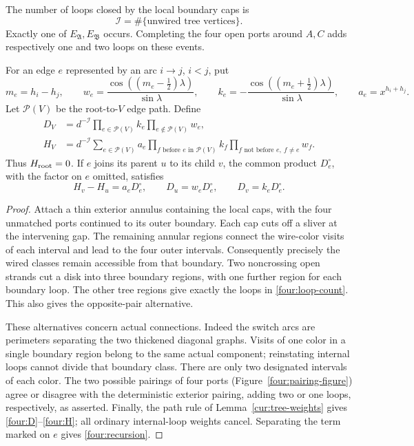 \begin{lemma}
\label{four:tree}
The number of loops closed by the local boundary caps is
\begin{equation}
 \mathcal I=\#\{\text{unwired tree vertices}\}.
 \label{four:loop-count}
\end{equation}
Exactly one of $E_{\mathfrak A},E_{\mathfrak B}$ occurs.  Completing the
four open ports around $A,C$ adds respectively one and two loops on these
events.

For an edge $e$ represented by an arc $i\to j$, $i<j$, put
\begin{equation}
 m_e=h_i-h_j,\qquad
 w_e=\frac{\cos((m_e-\tfrac12)\lambda)}{\sin\lambda},\qquad
 k_e=-\frac{\cos((m_e+\tfrac12)\lambda)}{\sin\lambda},\qquad
 a_e=x^{h_i+h_j}.
 \label{four:edge-weights}
\end{equation}
Let $\mathcal P(V)$ be the root-to-$V$ edge path.  Define
\begin{align}
 D_V&=d^{-\mathcal I}\prod_{e\in\mathcal P(V)}k_e
                         \prod_{e\notin\mathcal P(V)}w_e,\label{four:D}\\
 H_V&=d^{-\mathcal I}\sum_{e\in\mathcal P(V)}a_e
       \prod_{f\text{ before }e\text{ in }\mathcal P(V)}k_f
       \prod_{f\text{ not before }e,\ f\ne e}w_f.
       \label{four:H}
\end{align}
Thus $H_{\rm root}=0$.  If $e$ joins its parent $u$ to its child $v$, the
common product $D_e^\circ$, with the factor on $e$ omitted, satisfies
\begin{equation}
 H_v-H_u=a_eD_e^\circ,\qquad
 D_u=w_eD_e^\circ,\qquad D_v=k_eD_e^\circ.
 \label{four:recursion}
\end{equation}
\end{lemma}

\begin{proof}
Attach a thin exterior annulus containing the local caps, with the four
unmatched ports continued to its outer boundary.  Each cap cuts off a
sliver at the intervening gap.  The remaining annular regions connect
the wire-color visits of each interval and lead to the four outer
intervals.  Consequently precisely the wired classes remain accessible
from that boundary.  Two noncrossing open strands cut a disk into three
boundary regions, with one further region for each boundary loop.  The
other tree regions give exactly the loops in \eqref{four:loop-count}.
This also gives the opposite-pair alternative.

These alternatives concern actual connections.  Indeed the switch arcs
are perimeters separating the two thickened diagonal graphs.  Visits of
one color in a single boundary region belong to the same actual component;
reinstating internal loops cannot divide that boundary class.  There
are only two designated intervals of each color.  The two possible
pairings of four ports (Figure~\ref{four:pairing-figure}) agree or disagree with the deterministic exterior
pairing, adding two or one loops, respectively, as asserted.  Finally,
the path rule of Lemma~\ref{cur:tree-weights} gives
\eqref{four:D}--\eqref{four:H}; all ordinary internal-loop weights cancel.
Separating the term marked on $e$ gives \eqref{four:recursion}.
\end{proof}

